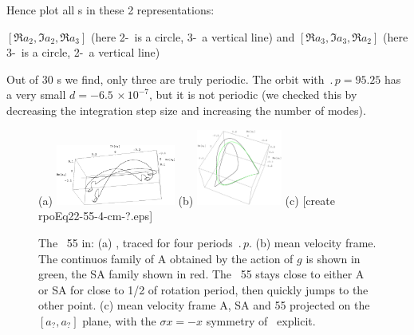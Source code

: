 Hence plot all \rpo s in these 2 representations:

$[ \Re a_2, \Im a_2, \Re a_3 ]$
(here 2-\eqv\  is a circle, 3-\eqv\ a vertical line)
 and
$[ \Re a_3, \Im a_3, \Re a_2 ]$
(here 3-\eqv\ is a circle, 2-\eqv\ a vertical line)

%
Out of 30 \rpo s we
find,  only three are truly periodic.  The orbit
with $\period{p} = 95.25$ has a very small
$d = -6.5\,\times 10^{-7}$, but it is not periodic
(we
checked this by decreasing the integration step size and increasing the
number of modes).


\begin{figure}[t] \label{f:rpo55}
\begin{center}
(a) \includegraphics[width=0.35\textwidth]{figs/rpo22-55-4-clean.eps}
(b) \includegraphics[width=0.25\textwidth]{figs/rpoEq22-55-4-cm.eps}
(c) [create rpoEq22-55-4-cm-?.eps]
\end{center}
\caption{
 The \rpo\ {\nameit}55 in:
 (a) \Statesp, traced for four periods $\period{p}$.
 (b) mean velocity frame.
        The continuos family of
    {\eqva} A obtained by the action of $g$ is shown in green,
    the SA family shown in red. The \rpo\ {\nameit}55 stays close
    to either A or SA for close to 1/2 of {\eqv} rotation
    period, then quickly jumps to the other {\eqv} point.
 (c) mean velocity frame A, SA and {\nameit}55 projected on the
    $[a_?,a_?]$ plane,
    with the $\sigma x = -x$ symmetry of \KSe\ explicit.
        }
\end{figure}



